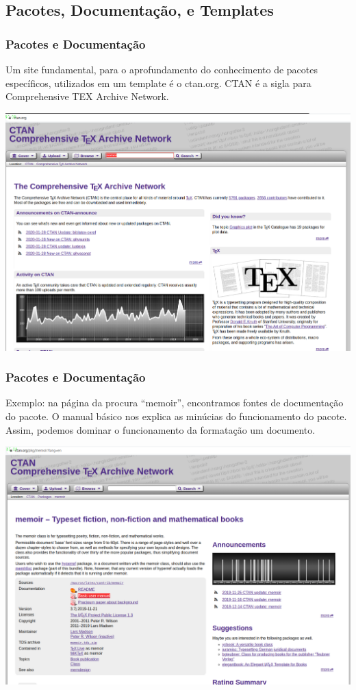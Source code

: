 \documentclass{beamer}
\begin{document}
\begin{frame}

  \section{Pacotes, Documentação, e Templates}
  \frametitle{Pacotes e Documentação}
  Um site fundamental, para o aprofundamento do conhecimento de
  pacotes específicos, utilizados em um
  template é o ctan.org. CTAN é a sigla para Comprehensive TEX Archive Network.
  \begin{center}
    \includegraphics[scale=0.20]{../Imagens/CTAN2.png}
  \end{center}

\end{frame}



\begin{frame}
  \frametitle{Pacotes e Documentação}
  Exemplo: na página da procura ``memoir'', encontramos fontes de
  documentação do pacote. O manual básico nos explica as minúcias do
  funcionamento do pacote. Assim, podemos dominar o funcionamento da formatação
  um documento.
  \begin{center}
    \includegraphics[scale=0.18]{../Imagens/CTAN3.png}
  \end{center}

\end{frame}
\end{document}
